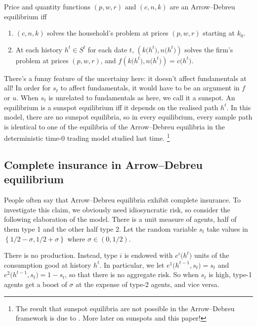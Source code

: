 \documentclass[11pt,letterpaper,reqno,oneside]{article}
\begin{document}
\begin{definition}
	Price and quantity functions $(p,w,r)$ and $(c,n,k)$ are an Arrow--Debreu equilibrium iff
	\begin{enumerate}

		\item $(c,n,k)$ solves the household's problem at prices $(p,w,r)$ starting at $k_0$.

		\item At each history $h^t \in S^t$ for each date $t$, $\left( k\bigl(h^t\bigr), n\bigl(h^t\bigr) \right)$ solves the firm's problem at prices $(p,w,r)$, and $f\left( k\bigl(h^t\bigr), n\bigl(h^t\bigr) \right) = c\bigl( h^t \bigr)$.

	\end{enumerate}
\end{definition}


There's a funny feature of the uncertainy here: it doesn't affect fundamentals at all! In order for $s_t$ to affect fundamentals, it would have to be an argument in $f$ or $u$. When $s_t$ is unrelated to fundamentals as here, we call it a sunspot. An equilibrium is a sunspot equilibrium iff it depends on the realised path $h^t$. In this model, there are no sunspot equilibria, so in every equilibrium, every sample path is identical to one of the equilibria of the Arrow--Debreu equilibria in the deterministic time-0 trading model studied last time.%
	\footnote{The result that sunspot equilibria are not possible in the Arrow--Debreu framework is due to \textcite{CassShell1983}. More later on sunspots and this paper!}



\subsection{Complete insurance in Arrow--Debreu equilibrium}
\label{sec:19Oct2015:complete_insurance_in_AD_eqm}

People often say that Arrow--Debreu equilibria exhibit complete insurance. To investigate this claim, we obviously need idiosyncratic risk, so consider the following elaboration of the model. There is a unit measure of agents, half of them type 1 and the other half type 2. Let the random variable $s_t$ take values in $\left\{ 1/2 - \sigma, 1/2 + \sigma \right\}$ where $\sigma \in (0,1/2)$.

There is no production. Instead, type $i$ is endowed with $e^i\bigl( h^t \bigr)$ units of the consumption good at history $h^t$. In particular, we let $e^1\bigl( h^{t-1}, s_t \bigr) = s_t$ and $e^2\bigl( h^{t-1}, s_t \bigr) = 1 - s_t$, so that there is no aggregate risk. So when $s_t$ is high, type-1 agents get a boost of $\sigma$ at the expense of type-2 agents, and vice versa.
\end{document}
